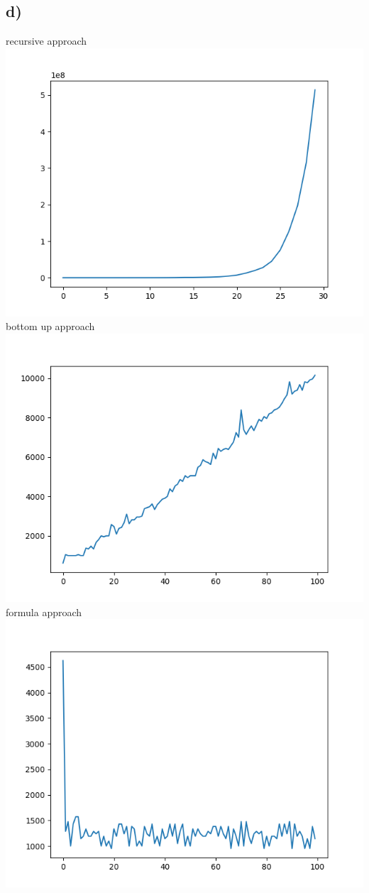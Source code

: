 \documentclass{article}
\begin{document}
\subsection*{d)}
recursive approach \\
\includegraphics{recursive.png}
bottom up approach \\
\includegraphics{bottom_up.png}
formula approach \\
\includegraphics{formula.png}
\end{document}
